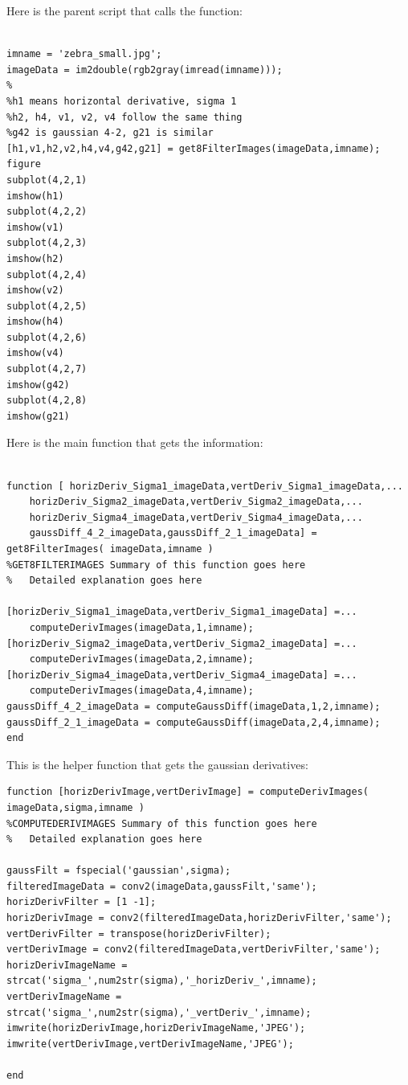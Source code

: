 \documentclass[11pt,psfig]{article}
\begin{document}
Here is the parent script that calls the function:

\begin{verbatim}

imname = 'zebra_small.jpg';
imageData = im2double(rgb2gray(imread(imname)));
%
%h1 means horizontal derivative, sigma 1
%h2, h4, v1, v2, v4 follow the same thing
%g42 is gaussian 4-2, g21 is similar
[h1,v1,h2,v2,h4,v4,g42,g21] = get8FilterImages(imageData,imname);
figure
subplot(4,2,1)
imshow(h1)
subplot(4,2,2)
imshow(v1)
subplot(4,2,3)
imshow(h2)
subplot(4,2,4)
imshow(v2)
subplot(4,2,5)
imshow(h4)
subplot(4,2,6)
imshow(v4)
subplot(4,2,7)
imshow(g42)
subplot(4,2,8)
imshow(g21)

\end{verbatim}

Here is the main function that gets the information:

\begin{verbatim}

function [ horizDeriv_Sigma1_imageData,vertDeriv_Sigma1_imageData,...
    horizDeriv_Sigma2_imageData,vertDeriv_Sigma2_imageData,...
    horizDeriv_Sigma4_imageData,vertDeriv_Sigma4_imageData,...
    gaussDiff_4_2_imageData,gaussDiff_2_1_imageData] = get8FilterImages( imageData,imname )
%GET8FILTERIMAGES Summary of this function goes here
%   Detailed explanation goes here

[horizDeriv_Sigma1_imageData,vertDeriv_Sigma1_imageData] =...
    computeDerivImages(imageData,1,imname);
[horizDeriv_Sigma2_imageData,vertDeriv_Sigma2_imageData] =...
    computeDerivImages(imageData,2,imname);
[horizDeriv_Sigma4_imageData,vertDeriv_Sigma4_imageData] =...
    computeDerivImages(imageData,4,imname);
gaussDiff_4_2_imageData = computeGaussDiff(imageData,1,2,imname);
gaussDiff_2_1_imageData = computeGaussDiff(imageData,2,4,imname);
end

\end{verbatim}

This is the helper function that gets the gaussian derivatives:

\begin{verbatim}
function [horizDerivImage,vertDerivImage] = computeDerivImages( imageData,sigma,imname )
%COMPUTEDERIVIMAGES Summary of this function goes here
%   Detailed explanation goes here

gaussFilt = fspecial('gaussian',sigma);
filteredImageData = conv2(imageData,gaussFilt,'same');
horizDerivFilter = [1 -1];
horizDerivImage = conv2(filteredImageData,horizDerivFilter,'same');
vertDerivFilter = transpose(horizDerivFilter);
vertDerivImage = conv2(filteredImageData,vertDerivFilter,'same');
horizDerivImageName = strcat('sigma_',num2str(sigma),'_horizDeriv_',imname);
vertDerivImageName = strcat('sigma_',num2str(sigma),'_vertDeriv_',imname);
imwrite(horizDerivImage,horizDerivImageName,'JPEG');
imwrite(vertDerivImage,vertDerivImageName,'JPEG');

end
\end{verbatim}
\end{document}
